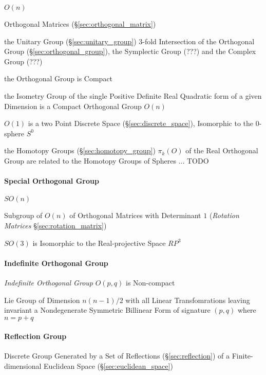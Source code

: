 $O(n)$

Orthogonal Matrices (\S\ref{sec:orthogonal_matrix})

the Unitary Group (\S\ref{sec:unitary_group}) 3-fold Intersection of the
Orthogonal Group (\S\ref{sec:orthogonal_group}), the Symplectic Group (???) and
the Complex Group (???) %

the Orthogonal Group is Compact

the Isometry Group of the single Positive Definite Real Quadratic form of a
given Dimension is a Compact Orthogonal Group $O(n)$

$O(1)$ is a two Point Discrete Space (\S\ref{sec:discrete_space}), Isomorphic
to the $0$-sphere $S^0$

the Homotopy Groups (\S\ref{sec:homotopy_group}) $\pi_k(O)$ of the Real
Orthogonal Group are related to the Homotopy Groups of Spheres
... TODO



\paragraph{Special Orthogonal Group}\label{sec:special_orthogonal_group}\hfill

$SO(n)$

Subgroup of $O(n)$ of Orthogonal Matrices with Determinant $1$ (\emph{Rotation
  Matrices} \S\ref{sec:rotation_matrix})

$SO(3)$ is Isomorphic to the Real-projective Space $RP^3$



\paragraph{Indefinite Orthogonal Group}
\label{sec:indefinite_orthogonal_group}\hfill

\emph{Indefinite Orthogonal Group} $O(p,q)$ is Non-compact

Lie Group of Dimension $n(n-1)/2$ with all Linear Transfomrations leaving
invariant a Nondegenerate Symmetric Billinear Form of signature $(p,q)$ where
$n = p+q$



\paragraph{Reflection Group}\label{sec:reflection_group}\hfill

Discrete Group Generated by a Set of Reflections (\S\ref{sec:reflection}) of a
Finite-dimensional Euclidean Space (\S\ref{sec:euclidean_space})



